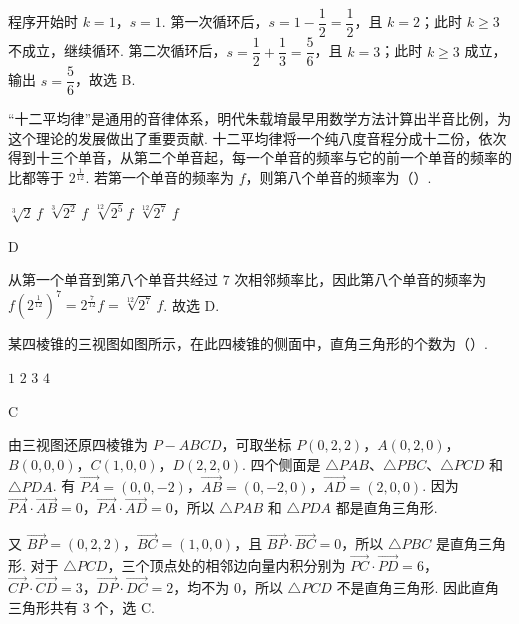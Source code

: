 \begin{solution}
程序开始时 \(k=1\)，\(s=1\). 第一次循环后，\(s=1-\dfrac12=\dfrac12\)，且 \(k=2\)；此时 \(k\geq3\) 不成立，继续循环. 第二次循环后，\(s=\dfrac12+\dfrac13=\dfrac56\)，且 \(k=3\)；此时 \(k\geq3\) 成立，输出 \(s=\dfrac56\)，故选 B.
\end{solution}

\begin{problem}
“十二平均律”是通用的音律体系，明代朱载堉最早用数学方法计算出半音比例，为这个理论的发展做出了重要贡献. 十二平均律将一个纯八度音程分成十二份，依次得到十三个单音，从第二个单音起，每一个单音的频率与它的前一个单音的频率的比都等于 \(2^{\frac1{12}}\). 若第一个单音的频率为 \(f\)，则第八个单音的频率为（\quad）.

\choices
    {\(\sqrt[3]{2}\,f\)}
    {\(\sqrt[3]{2^2}\,f\)}
    {\(\sqrt[12]{2^5}\,f\)}
    {\(\sqrt[12]{2^7}\,f\)}
\end{problem}

\begin{answer}
D
\end{answer}

\begin{solution}
从第一个单音到第八个单音共经过 \(7\) 次相邻频率比，因此第八个单音的频率为
\(f\left(2^{\frac1{12}}\right)^7=2^{\frac7{12}}f=\sqrt[12]{2^7}\,f\).
故选 D.
\end{solution}

\begin{problem}
某四棱锥的三视图如图所示，在此四棱锥的侧面中，直角三角形的个数为（\quad）.


\choices
    {\(1\)}
    {\(2\)}
    {\(3\)}
    {\(4\)}
\end{problem}

\begin{answer}
C
\end{answer}

\begin{solution}
由三视图还原四棱锥为 \(P-ABCD\)，可取坐标
\(P(0,2,2)\)，\(A(0,2,0)\)，\(B(0,0,0)\)，\(C(1,0,0)\)，\(D(2,2,0)\).
四个侧面是 \(\triangle PAB\)、\(\triangle PBC\)、\(\triangle PCD\) 和 \(\triangle PDA\). 有
\(\overrightarrow{PA}=(0,0,-2)\)，\(\overrightarrow{AB}=(0,-2,0)\)，\(\overrightarrow{AD}=(2,0,0)\). 因为
\(\overrightarrow{PA}\cdot\overrightarrow{AB}=0\)，\(\overrightarrow{PA}\cdot\overrightarrow{AD}=0\)，所以 \(\triangle PAB\) 和 \(\triangle PDA\) 都是直角三角形.

又 \(\overrightarrow{BP}=(0,2,2)\)，\(\overrightarrow{BC}=(1,0,0)\)，且 \(\overrightarrow{BP}\cdot\overrightarrow{BC}=0\)，所以 \(\triangle PBC\) 是直角三角形. 对于 \(\triangle PCD\)，三个顶点处的相邻边向量内积分别为
\(\overrightarrow{PC}\cdot\overrightarrow{PD}=6\)，\(\overrightarrow{CP}\cdot\overrightarrow{CD}=3\)，\(\overrightarrow{DP}\cdot\overrightarrow{DC}=2\)，均不为 \(0\)，所以 \(\triangle PCD\) 不是直角三角形. 因此直角三角形共有 \(3\) 个，选 C.
\end{solution}

